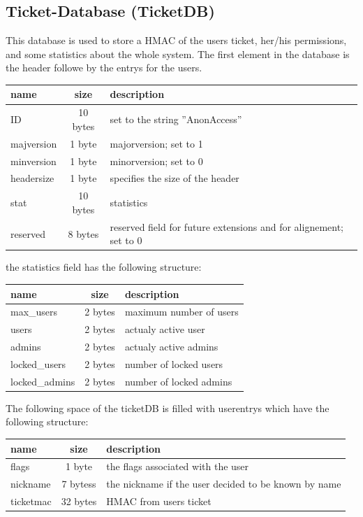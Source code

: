 \subsection{Ticket-Database (TicketDB)}
This database is used to store a HMAC of the users ticket, her/his permissions, and some statistics about the whole system.
The first element in the database is the header followe by the entrys for the users.\\
\begin{tabular}{|l|c|l|}\hline 
name & size & description \\ \hline
ID & 10 bytes & set to the string ''AnonAccess'' \\
majversion & 1 byte & majorversion; set to 1 \\
minversion & 1 byte & minorversion; set to 0 \\
headersize & 1 byte & specifies the size of the header \\
stat & 10 bytes & statistics \\
reserved & 8 bytes & reserved field for future extensions and for alignement; set to 0 \\ \hline
\end{tabular} 


 the statistics field has the following structure:\\
\begin{tabular}{|l|c|l|} \hline
name & size & description \\ \hline 
max\_users     & 2 bytes & maximum number of users \\
users              & 2 bytes & actualy active user \\
admins           & 2 bytes & actualy active admins \\
locked\_users   & 2 bytes & number of locked users \\
locked\_admins & 2 bytes & number of locked admins \\ \hline
\end{tabular} 

The following space of the ticketDB is filled with userentrys which have the following structure:\\
\begin{tabular}{|l|c|l|} \hline
name & size & description \\ \hline 
flags         & 1 byte    & the flags associated with the user \\
nickname  & 7 bytess & the nickname if the user decided to be known by name \\
ticketmac  & 32 bytes & HMAC from users ticket \\ \hline
\end{tabular} 

